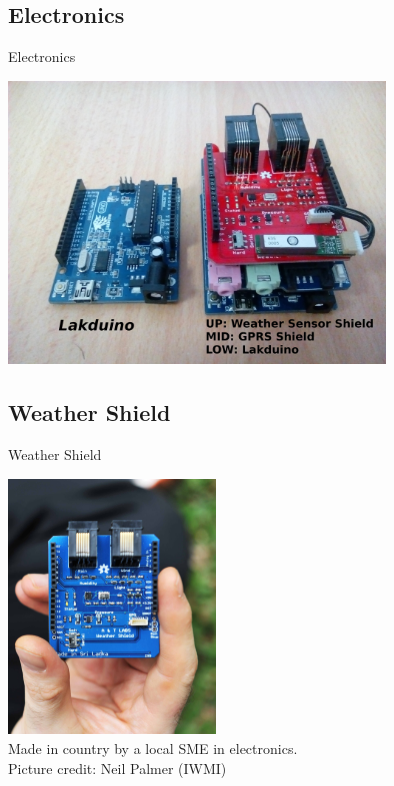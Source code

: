 \documentclass[xcolor=dvipsnames,beamer]{beamer} %
\begin{document}
\subsection{Electronics}
\begin{frame}[fragile]{Electronics}

\begin{center}
 \includegraphics[width=10cm]{MWSv1_annotated}
\end{center}

\end{frame}

\subsection{Weather Shield}
\begin{frame}[fragile]{Weather Shield}

\begin{center}
 \includegraphics[width=5.5cm]{WeatherShield}\\
\vspace{5mm}
Made in country by a local SME in electronics.\\
Picture credit: Neil Palmer (IWMI)
\end{center}

\end{frame}
\end{document}

